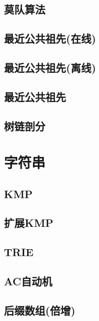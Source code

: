 \section{莫队算法}
\raggedbottom
\hrulefill
\section{最近公共祖先(在线)}
\raggedbottom
\hrulefill
\section{最近公共祖先(离线)}
\raggedbottom
\hrulefill
\section{最近公共祖先}
\raggedbottom
\hrulefill
\section{树链剖分}
\raggedbottom
\hrulefill

\chapter{字符串}
\section{KMP}
\raggedbottom
\hrulefill
\section{扩展KMP}
\raggedbottom
\hrulefill
\section{TRIE}
\raggedbottom
\hrulefill
\section{AC自动机}
\raggedbottom
\hrulefill
\section{后缀数组(倍增)}
\raggedbottom
\hrulefill
